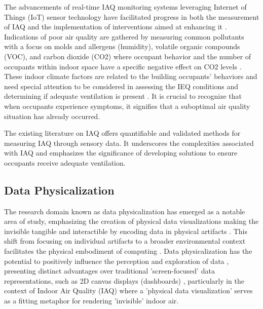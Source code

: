 The advancements of real-time IAQ monitoring systems leveraging Internet of Things (IoT) sensor technology have facilitated progress in both the measurement of IAQ and the implementation of interventions aimed at enhancing it \cite{pantelic_transformational_2022}. Indications of poor air quality are gathered by measuring common pollutants with a focus on molds and allergens (humidity), volatile organic compounds (VOC), and carbon dioxide (CO2) \cite{klepeis_national_2001} where occupant behavior and the number of occupants within indoor space have a specific negative effect on CO2 levels \cite{fromme_indoor_2023}. These indoor climate factors are related to the building occupants’ behaviors and need special attention to be considered in assessing the IEQ conditions and determining if adequate ventilation is present \cite{du_indoor_2020}. It is crucial to recognize that when occupants experience symptoms, it signifies that a suboptimal air quality situation has already occurred.

The existing literature on IAQ offers quantifiable and validated methods for measuring IAQ through sensory data. It underscores the complexities associated with IAQ and emphasizes the significance of developing solutions to ensure occupants receive adequate ventilation.


\subsection{Data Physicalization}

The research domain known as data physicalization \cite{alexander_data_2019, jansen_opportunities_2015} has emerged as a notable area of study, emphasizing the creation of physical data visualizations making the invisible tangible and interactible by encoding data in physical artifacts \cite{ranasinghe_encoding_2023}. This shift from focusing on individual artifacts to a broader environmental context facilitates the physical embodiment of computing \cite{dragicevic_data_2020}. Data physicalization has the potential to positively influence the perception and exploration of data \cite{jansen_opportunities_2015}, presenting distinct advantages over traditional 'screen-focused' data representations, such as 2D canvas displays (dashboards) \cite{hornecker_design_2023}, particularly in the context of Indoor Air Quality (IAQ) where a 'physical data visualization' serves as a fitting metaphor for rendering 'invisible' indoor air.

